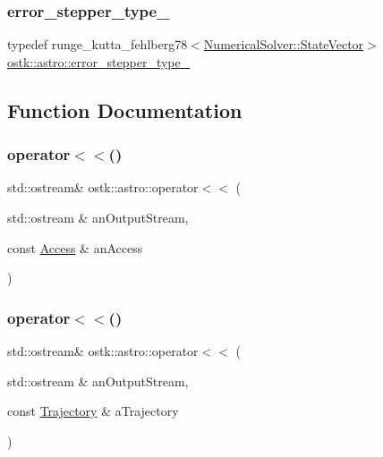 \subsubsection{\texorpdfstring{error\+\_\+stepper\+\_\+type\+\_}{error\_stepper\_type\_78}}
{\footnotesize\ttfamily typedef runge\+\_\+kutta\+\_\+fehlberg78$<$\hyperlink{classostk_1_1astro_1_1_numerical_solver_a4a1673a6f74a72d6bacfe6480b9c1ccd}{Numerical\+Solver\+::\+State\+Vector}$>$ \hyperlink{namespaceostk_1_1astro_ac65cff551d02047f499131307bd5f688}{ostk\+::astro\+::error\+\_\+stepper\+\_\+type\+\_}}



\subsection{Function Documentation}
\mbox{\label{namespaceostk_1_1astro_ad6bf403749e98996e2e56cd6dc8cc848}} 
\subsubsection{\texorpdfstring{operator$<$$<$()}{operator<<()}\hspace{0.1cm}{\footnotesize\ttfamily [1/3]}}
{\footnotesize\ttfamily std\+::ostream\& ostk\+::astro\+::operator$<$$<$ (\begin{DoxyParamCaption}\item[{std\+::ostream \&}]{an\+Output\+Stream,  }\item[{const \hyperlink{classostk_1_1astro_1_1_access}{Access} \&}]{an\+Access }\end{DoxyParamCaption})}

\mbox{\label{namespaceostk_1_1astro_a0cb767c3814a31416e0491406bc56ed2}} 
\subsubsection{\texorpdfstring{operator$<$$<$()}{operator<<()}\hspace{0.1cm}{\footnotesize\ttfamily [2/3]}}
{\footnotesize\ttfamily std\+::ostream\& ostk\+::astro\+::operator$<$$<$ (\begin{DoxyParamCaption}\item[{std\+::ostream \&}]{an\+Output\+Stream,  }\item[{const \hyperlink{classostk_1_1astro_1_1_trajectory}{Trajectory} \&}]{a\+Trajectory }\end{DoxyParamCaption})}


